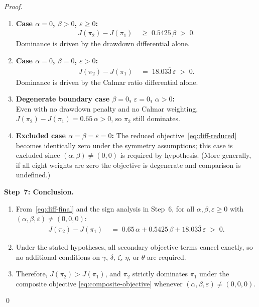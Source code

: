 \documentclass[12pt,openany]{book}
\numberwithin{equation}{chapter}
\theoremstyle{plain}
\theoremstyle{definition}
\theoremstyle{remark}
\numberwithin{equation}{chapter}
\theoremstyle{plain}
\begin{document}
\begin{proof}
\begin{enumerate}
  \item \textbf{Case $\alpha = 0$, $\beta > 0$, $\varepsilon \geq 0$:}
        \begin{align}
          J(\pi_2) - J(\pi_1)
          &\;\geq\; 0.5425\,\beta \;>\; 0.
        \end{align}
        Dominance is driven by the drawdown differential alone.

  \item \textbf{Case $\alpha = 0$, $\beta = 0$, $\varepsilon > 0$:}
        \begin{align}
          J(\pi_2) - J(\pi_1)
          &\;=\; 18.03\overline{3}\,\varepsilon \;>\; 0.
        \end{align}
        Dominance is driven by the Calmar ratio differential alone.

  \item \textbf{Degenerate boundary case $\beta = 0$, $\varepsilon = 0$,
        $\alpha > 0$:}\\
        Even with no drawdown penalty and no Calmar weighting,
        $J(\pi_2) - J(\pi_1) = 0.65\,\alpha > 0$, so $\pi_2$ still
        dominates.

  \item \textbf{Excluded case $\alpha = \beta = \varepsilon = 0$:}
        The reduced objective~\eqref{eq:diff-reduced} becomes
        identically zero under the symmetry assumptions; this case is
        excluded since $(\alpha, \beta) \neq (0,0)$ is required by
        hypothesis.  (More generally, if all eight weights are zero
        the objective is degenerate and comparison is undefined.)
\end{enumerate}

\medskip
\noindent\textbf{Step~7: Conclusion.}

\begin{enumerate}
  \item From~\eqref{eq:diff-final} and the sign analysis in Step~6,
        for all $\alpha, \beta, \varepsilon \geq 0$ with
        $(\alpha,\beta,\varepsilon) \neq (0,0,0)$:
        \begin{align}
          J(\pi_2) - J(\pi_1)
          &\;=\; 0.65\,\alpha + 0.5425\,\beta
                 + 18.03\overline{3}\,\varepsilon
          \;>\; 0.
        \end{align}
  \item Under the stated hypotheses, all secondary objective terms
        cancel exactly, so no additional conditions on $\gamma$,
        $\delta$, $\zeta$, $\eta$, or $\theta$ are required.
  \item Therefore, $J(\pi_2) > J(\pi_1)$, and $\pi_2$ strictly
        dominates $\pi_1$ under the composite objective
        \eqref{eq:composite-objective} whenever
        $(\alpha,\beta,\varepsilon) \neq (0,0,0)$.
\end{enumerate}
\qed
\end{proof}
\end{document}
